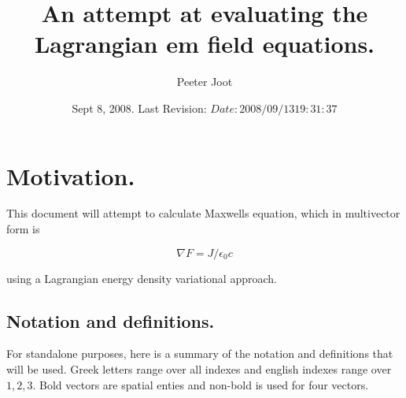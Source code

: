 \documentclass{article}
\title{ An attempt at evaluating the Lagrangian em field equations. }
\author{Peeter Joot}
\date{ Sept 8, 2008.  Last Revision: $Date: 2008/09/13 19:31:37 $ }
\newcommand{\grad}[0]{\nabla}
\begin{document}
\tableofcontents

\maketitle{}

\section{ Motivation. }

This document will attempt to calculate Maxwells equation, which in multivector form is

\begin{equation}
\grad F = J/\epsilon_0 c
\end{equation}

using a Lagrangian energy density variational approach.

\subsection{ Notation and definitions. }

For standalone purposes, here is a summary of the notation and definitions that will be used.  Greek letters range over all indexes and
english indexes range over $1,2,3$.  Bold vectors are spatial enties and non-bold is used for four vectors.
\end{document}
